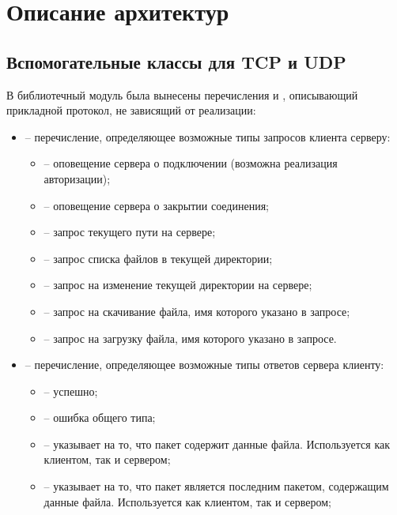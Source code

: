 \newpage

\section{Описание архитектур}


\subsection{Вспомогательные классы для TCP и UDP}

В библиотечный модуль  была вынесены перечисления  и , описывающий прикладной протокол, не зависящий от реализации:
\begin{itemize}
	\item {} -- перечисление, определяющее возможные типы запросов клиента серверу:
	\begin{itemize}
		\item {} -- оповещение сервера о подключении (возможна реализация авторизации);
		\item {} -- оповещение сервера о закрытии соединения;
		\item {} -- запрос текущего пути на сервере;
		\item {} -- запрос списка файлов в текущей директории;
		\item {} -- запрос на изменение текущей директории на сервере;
		\item {} -- запрос на скачивание файла, имя которого указано в запросе;
		\item {} -- запрос на загрузку файла, имя которого указано в запросе.
	\end{itemize}
	\item {} -- перечисление, определяющее возможные типы ответов сервера клиенту:
	\begin{itemize}
		\item {} -- успешно;
		\item {} -- ошибка общего типа;
		\item {} -- указывает на то, что пакет содержит данные файла. Используется как клиентом, так и сервером;
		\item {} -- указывает на то, что пакет является последним пакетом, содержащим данные файла. Используется как клиентом, так и сервером;

\end{itemize}
\end{itemize}
